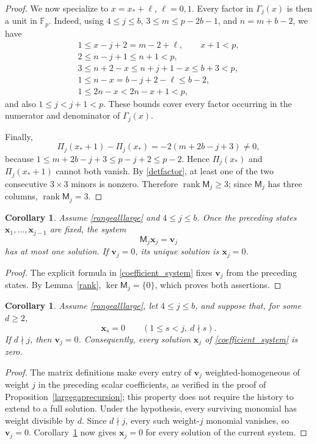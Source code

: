 \documentclass[10pt,a4paper]{amsart}
\newtheorem{corollary}[lemma]{Corollary}
\newcommand{\F}{\mathbb{F}_p}
\begin{document}
\begin{proof}
We now specialize to $x=x_*+\ell$, $\ell=0,1$.  Every factor in
$\Gamma_j(x)$ is then a unit in $\F$.  Indeed, using
$4\le j\le b$, $3\le m\le p-2b-1$, and $n=m+b-2$, we have
\[
\begin{gathered}
 1\le x-j+2=m-2+\ell,\qquad x+1<p,\\
 2\le n-j+1\le n+1<p,\\
 3\le n+2-x\le n+j+1-x\le b+3<p,\\
 1\le n-x=b-j+2-\ell\le b-2,\\
 1\le 2n-x<2n-x+1<p,
\end{gathered}
\]
and also $1\le j<j+1<p$.  These bounds cover every factor occurring
in the numerator and denominator of $\Gamma_j(x)$.

Finally,
\begin{equation}\label{detdifference}
 \Pi_j(x_*+1)-\Pi_j(x_*)=-2(m+2b-j+3)\ne0,
\end{equation}
because
$1\le m+2b-j+3\le p-j+2\le p-2$.  Hence
$\Pi_j(x_*)$ and $\Pi_j(x_*+1)$ cannot both vanish.  By
\eqref{detfactor}, at least one of the two consecutive $3\times3$
minors is nonzero.  Therefore $\operatorname{rank}\mathsf M_j\ge3$; since
$\mathsf M_j$ has three columns, $\operatorname{rank}\mathsf M_j=3$.
\end{proof}

\begin{corollary}\label{uniquecontinuation}
Assume \eqref{rangealllarge} and $4\le j\le b$.  Once the preceding
states $\mathbf x_1,\ldots,\mathbf x_{j-1}$ are fixed, the system
\[
 \mathsf M_j\mathbf x_j=\mathbf v_j
\]
has at most one solution.  If $\mathbf v_j=0$, its unique solution is
$\mathbf x_j=0$.
\end{corollary}
\begin{proof}
The explicit formula in \eqref{coefficient_system} fixes $\mathbf v_j$
from the preceding states.  By Lemma~\ref{rank},
$\ker\mathsf M_j=\{0\}$, which proves both assertions.
\end{proof}

\begin{corollary}\label{supportpropagation}
Assume \eqref{rangealllarge}, let $4\le j\le b$, and suppose that, for
some $d\ge2$,
\[
 \mathbf x_s=0\qquad(1\le s<j,\ d\nmid s).
\]
If $d\nmid j$, then $\mathbf v_j=0$.  Consequently, every solution
$\mathbf x_j$ of \eqref{coefficient_system} is zero.
\end{corollary}
\begin{proof}
The matrix definitions make every entry of $\mathbf v_j$
weighted-homogeneous of weight $j$ in the preceding scalar coefficients,
as verified in the proof of Proposition~\ref{largegaprecursion}; this
property does not require the history to extend to a full solution.
Under the hypothesis, every surviving monomial has weight divisible by
$d$.  Since $d\nmid j$, every such weight-$j$ monomial vanishes, so
$\mathbf v_j=0$.  Corollary~\ref{uniquecontinuation} now gives
$\mathbf x_j=0$ for every solution of the current system.
\end{proof}
\end{document}
